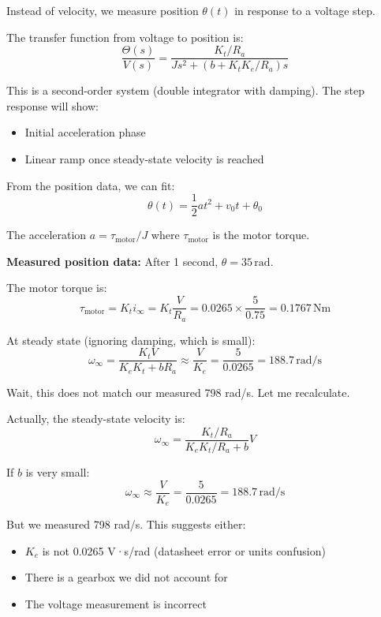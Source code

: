 Instead of velocity, we measure position $\theta(t)$ in response to a voltage step.

The transfer function from voltage to position is:
\begin{equation}
\frac{\Theta(s)}{V(s)} = \frac{K_t/R_a}{Js^2 + (b + K_tK_e/R_a)s}
\end{equation}

This is a second-order system (double integrator with damping). The step response will show:
\begin{itemize}
    \item Initial acceleration phase
    \item Linear ramp once steady-state velocity is reached
\end{itemize}

From the position data, we can fit:
\begin{equation}
\theta(t) = \frac{1}{2}at^2 + v_0 t + \theta_0
\end{equation}

The acceleration $a = \tau_{\text{motor}}/J$ where $\tau_{\text{motor}}$ is the motor torque.

\textbf{Measured position data:} After 1 second, $\theta = 35 \, \text{rad}$.

The motor torque is:
\begin{equation}
\tau_{\text{motor}} = K_t i_{\infty} = K_t \frac{V}{R_a} = 0.0265 \times \frac{5}{0.75} = 0.1767 \, \text{Nm}
\end{equation}

At steady state (ignoring damping, which is small):
\begin{equation}
\omega_{\infty} = \frac{K_t V}{K_e K_t + bR_a} \approx \frac{V}{K_e} = \frac{5}{0.0265} = 188.7 \, \text{rad/s}
\end{equation}

Wait, this does not match our measured 798 rad/s. Let me recalculate.

Actually, the steady-state velocity is:
\begin{equation}
\omega_{\infty} = \frac{K_t/R_a}{K_e K_t / R_a + b} V
\end{equation}

If $b$ is very small:
\begin{equation}
\omega_{\infty} \approx \frac{V}{K_e} = \frac{5}{0.0265} = 188.7 \, \text{rad/s}
\end{equation}

But we measured 798 rad/s. This suggests either:
\begin{itemize}
    \item $K_e$ is not 0.0265 V·s/rad (datasheet error or units confusion)
    \item There is a gearbox we did not account for
    \item The voltage measurement is incorrect
\end{itemize}

